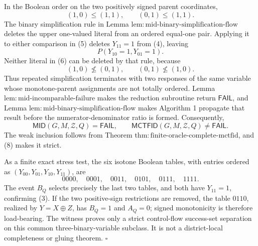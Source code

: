 In the Boolean order on the two positively signed parent coordinates,
\[
 (1,0)\le(1,1),
 \qquad
 (0,1)\le(1,1).
\tag{5}
\]
The binary simplification rule in Lemma \(\mathrm{lem:mid\text{-}binary\text{-}simplification\text{-}flow}\) deletes the upper one-valued literal from an ordered equal-one pair.  Applying it to either comparison in (5) deletes \(Y_{11}=1\) from (4), leaving
\[
 P(Y_{10}=1,Y_{01}=1).
\tag{6}
\]
Neither literal in (6) can be deleted by that rule, because
\[
 (1,0)\not\le(0,1),
 \qquad
 (0,1)\not\le(1,0).
\tag{7}
\]
Thus repeated simplification terminates with two responses of the same variable whose monotone-parent assignments are not totally ordered.  Lemma \(\mathrm{lem:mid\text{-}incomparable\text{-}failure}\) makes the reduction subroutine return \(\mathsf{FAIL}\), and Lemma \(\mathrm{lem:mid\text{-}binary\text{-}simplification\text{-}flow}\) makes Algorithm 1 propagate that result before the numerator-denominator ratio is formed.  Consequently,
\[
 \mathsf{MID}(G,M,\mathcal Z,Q)=\mathsf{FAIL},
 \qquad
 \mathsf{MCTFID}(G,M,\mathcal Z,Q)\ne\mathsf{FAIL}.
\tag{8}
\]
The weak inclusion follows from Theorem \(\mathrm{thm:finite\text{-}oracle\text{-}complete\text{-}mctfid}\), and (8) makes it strict.

As a finite exact stress test, the six isotone Boolean tables, with entries ordered as \((Y_{00},Y_{01},Y_{10},Y_{11})\), are
\[
 0000,\quad 0001,\quad 0011,\quad 0101,\quad 0111,\quad 1111.
\]
The event \(B_Q\) selects precisely the last two tables, and both have \(Y_{11}=1\), confirming (3).  If the two positive-sign restrictions are removed, the table \(0110\), realized by \(Y=X\mathbin{\oplus}Z\), has \(B_Q=1\) and \(A_Q=0\); signed monotonicity is therefore load-bearing.  The witness proves only a strict control-flow success-set separation on this common three-binary-variable subclass.  It is not a district-local completeness or gluing theorem. \(\square\)